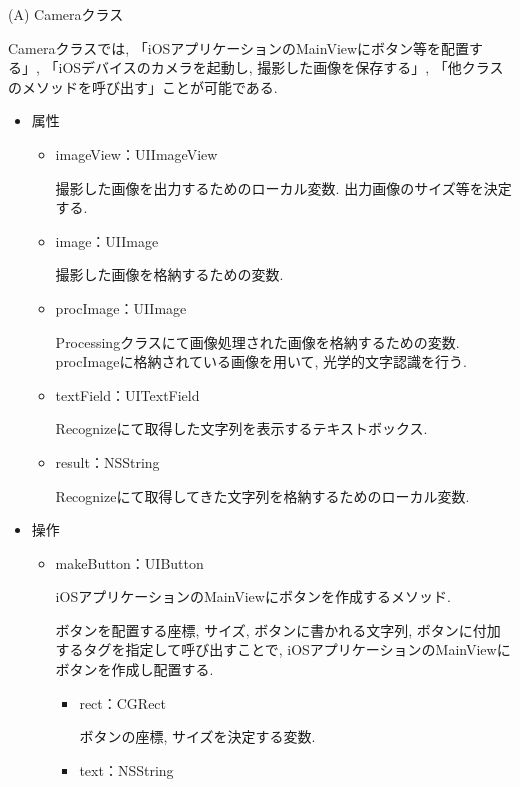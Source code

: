 \begin{description}

\item (A) Cameraクラス

Cameraクラスでは, 「iOSアプリケーションのMainViewにボタン等を配置する」, 「iOSデバイスのカメラを起動し, 撮影した画像を保存する」, 「他クラスのメソッドを呼び出す」ことが可能である.

\begin{itemize}
\item 属性

\begin{itemize}
\item imageView：UIImageView

撮影した画像を出力するためのローカル変数.
出力画像のサイズ等を決定する.

\item image：UIImage

撮影した画像を格納するための変数.

\item procImage：UIImage

Processingクラスにて画像処理された画像を格納するための変数.
procImageに格納されている画像を用いて, 光学的文字認識を行う.

\item textField：UITextField

Recognizeにて取得した文字列を表示するテキストボックス.

\item result：NSString

Recognizeにて取得してきた文字列を格納するためのローカル変数.
\end{itemize}

\item 操作

\begin{itemize}
\item makeButton：UIButton

iOSアプリケーションのMainViewにボタンを作成するメソッド.

ボタンを配置する座標, サイズ, ボタンに書かれる文字列, ボタンに付加するタグを指定して呼び出すことで, iOSアプリケーションのMainViewにボタンを作成し配置する.

\begin{itemize}
\item rect：CGRect

ボタンの座標, サイズを決定する変数.

\item text：NSString


\end{itemize}
\end{itemize}
\end{itemize}
\end{description}
